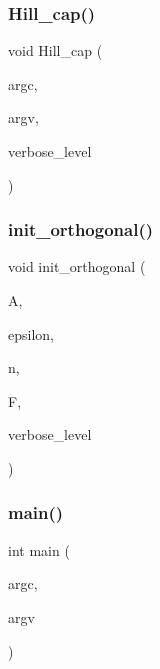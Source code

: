 \mbox{\label{hill_8_c_a7c2543fe497e681d4b492b16ea7f933e}} 
\subsubsection{\texorpdfstring{Hill\+\_\+cap()}{Hill\_cap()}}
{\footnotesize\ttfamily void Hill\+\_\+cap (\begin{DoxyParamCaption}\item[{int}]{argc,  }\item[{const char $\ast$$\ast$}]{argv,  }\item[{\mbox{\hyperlink{galois_8h_a09fddde158a3a20bd2dcadb609de11dc}{I\+NT}}}]{verbose\+\_\+level }\end{DoxyParamCaption})}

\mbox{\label{hill_8_c_abf695eb9f6a0c10d5aa0c0ce4b60ad6d}} 
\subsubsection{\texorpdfstring{init\+\_\+orthogonal()}{init\_orthogonal()}}
{\footnotesize\ttfamily void init\+\_\+orthogonal (\begin{DoxyParamCaption}\item[{\mbox{\hyperlink{classaction}{action}} $\ast$}]{A,  }\item[{\mbox{\hyperlink{galois_8h_a09fddde158a3a20bd2dcadb609de11dc}{I\+NT}}}]{epsilon,  }\item[{\mbox{\hyperlink{galois_8h_a09fddde158a3a20bd2dcadb609de11dc}{I\+NT}}}]{n,  }\item[{\mbox{\hyperlink{classfinite__field}{finite\+\_\+field}} $\ast$}]{F,  }\item[{\mbox{\hyperlink{galois_8h_a09fddde158a3a20bd2dcadb609de11dc}{I\+NT}}}]{verbose\+\_\+level }\end{DoxyParamCaption})}

\mbox{\label{hill_8_c_a217dbf8b442f20279ea00b898af96f52}} 
\subsubsection{\texorpdfstring{main()}{main()}}
{\footnotesize\ttfamily int main (\begin{DoxyParamCaption}\item[{int}]{argc,  }\item[{const char $\ast$$\ast$}]{argv }\end{DoxyParamCaption})}

